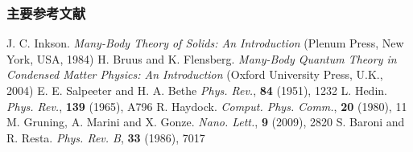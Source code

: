 \documentclass[cjk,slidestop,compress,mathserif,blue]{beamer}
\begin{document}
\begin{thebibliography}{99}
\frame
{
\frametitle{主要参考文献}
{\small
        \textrm{J. C. Inkson. \textit{Many-Body Theory of Solids: An Introduction} (Plenum Press, New York, USA, 1984)}
	\textrm{H. Bruus and K. Flensberg. \textit{Many-Body Quantum Theory in Condensed Matter Physics: An Introduction} (Oxford University Press, U.K., 2004)}
	\textrm{E. E. Salpeeter and H. A. Bethe \textit{Phys. Rev.}, \textbf{84} (1951), 1232}
	\textrm{L. Hedin. \textit{Phys. Rev.}, \textbf{139} (1965), A796}
	\fontsize{9.6pt}{3.9pt}
	\textrm{R. Haydock. \textit{Comput. Phys. Comm.}, \textbf{20} (1980), 11}
	\textrm{M. Gruning, A. Marini and X. Gonze. \textit{Nano. Lett.}, \textbf{9} (2009), 2820}
	\textrm{S. Baroni and R. Resta. \textit{Phys. Rev. B}, \textbf{33} (1986), 7017}
}
\nocite*{}
}
\end{thebibliography}
\end{document}
